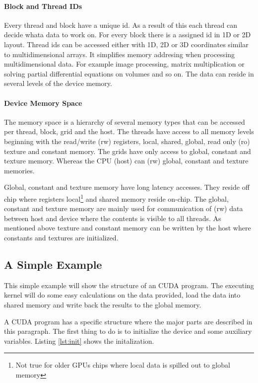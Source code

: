 \paragraph{Block and Thread IDs} %
\label{par:block_and_thread_ids}
Every thread and block have a unique id. As a result of this each thread can
decide whata data to work on. For every block there is a assigned id in 1D or 2D
layout. Thread ids can be accessed either with 1D, 2D or 3D coordinates similar
to multidimensional arrays. It simplifies memory addresing when processing
multidimensional data. For example image processing, matrix multiplication or
solving partial differential equations on volumes and so on. The data can reside
in several levels of the device memory. 

\paragraph{Device Memory Space} %
\label{par:device_memory_space}
The memory space is a hierarchy of several memory types that can be accessed per
thread, block, grid and the host. The threads have access to all memory levels
beginning with the read/write (rw) registers, local, shared, global, read only
(ro) texture and constant memory. The grids have only access to global, constant
and texture memory. Whereas the CPU (host) can (rw) global, constant and texture
memories.

Global, constant and texture memory have long latency accesses. They reside off
chip where registers local\footnote{Not true for older GPUs chips where local
data is spilled out to global memory} and shared memory reside on-chip. The
global, constant and texture memory are mainly used for communication of (rw)
data between host and device where the contents is visible to all threads. As
mentioned above texture and constant memory can be written by the host where
constants and textures are initialized.


\subsection*{A Simple Example} %
\label{sub:a_simple_example}
This simple example will show the structure of an CUDA program. The executing
kernel will do some easy calculations on the data provided, load the data into
shared memory  and write back the results to the global memory. 

A CUDA program has a specific structure where the major parts are described in
this paragraph. The first thing to do is to initialize the device and some
auxiliary variables. Listing \ref{lst:init} shows the initalization.

